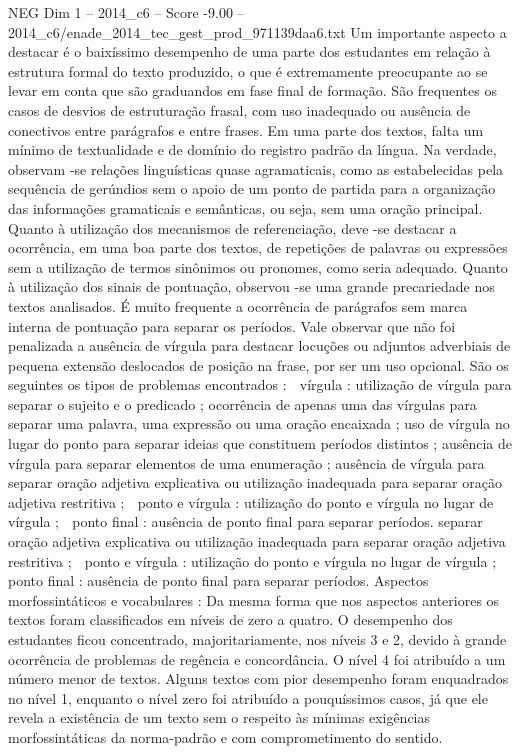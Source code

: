 \begin{textsample}{NEG Dim 1 – 2014\_c6 – Score -9.00 – 2014\_c6/enade\_2014\_tec\_gest\_prod\_971139daa6.txt}
Um importante aspecto a destacar é o baixíssimo desempenho de uma parte dos estudantes em relação à estrutura formal do texto produzido, o que é extremamente preocupante ao se levar em conta que são graduandos em fase final de formação.
São frequentes os casos de desvios de estruturação frasal, com uso inadequado ou ausência de conectivos entre parágrafos e entre frases.
Em uma parte dos textos, falta um mínimo de textualidade e de domínio do registro padrão da língua.
Na verdade, observam -se relações linguísticas quase agramaticais, como as estabelecidas pela sequência de gerúndios sem o apoio de um ponto de partida para a organização das informações gramaticais e semânticas, ou seja, sem uma oração principal.
Quanto à utilização dos mecanismos de referenciação, deve -se destacar a ocorrência, em uma boa parte dos textos, de repetições de palavras ou expressões sem a utilização de termos sinônimos ou pronomes, como seria adequado.
Quanto à utilização dos sinais de pontuação, observou -se uma grande precariedade nos textos analisados.
É muito frequente a ocorrência de parágrafos sem marca interna de pontuação para separar os períodos.
Vale observar que não foi penalizada a ausência de vírgula para destacar locuções ou adjuntos adverbiais de pequena extensão deslocados de posição na frase, por ser um uso opcional.
São os seguintes os tipos de problemas encontrados :  vírgula : utilização de vírgula para separar o sujeito e o predicado ; ocorrência de apenas uma das vírgulas para separar uma palavra, uma expressão ou uma oração encaixada ; uso de vírgula no lugar do ponto para separar ideias que constituem períodos distintos ; ausência de vírgula para separar elementos de uma enumeração ; ausência de vírgula para separar oração adjetiva explicativa ou utilização inadequada para separar oração adjetiva restritiva ;  ponto e vírgula : utilização do ponto e vírgula no lugar de vírgula ;  ponto final : ausência de ponto final para separar períodos. separar oração adjetiva explicativa ou utilização inadequada para separar oração adjetiva restritiva ;  ponto e vírgula : utilização do ponto e vírgula no lugar de vírgula ;  ponto final : ausência de ponto final para separar períodos.
Aspectos morfossintáticos e vocabulares : Da mesma forma que nos aspectos anteriores os textos foram classificados em níveis de zero a quatro.
O desempenho dos estudantes ficou concentrado, majoritariamente, nos níveis 3 e 2, devido à grande ocorrência de problemas de regência e concordância.
O nível 4 foi atribuído a um número menor de textos.
Alguns textos com pior desempenho foram enquadrados no nível 1, enquanto o nível zero foi atribuído a pouquíssimos casos, já que ele revela a existência de um texto sem o respeito às mínimas exigências morfossintáticas da norma-padrão e com comprometimento do sentido.

\end{textsample}
